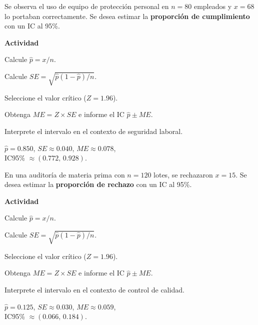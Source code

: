 \begin{ejercicio}[Uso de EPP (n=80)]
Se observa el uso de equipo de protección personal en $n=80$ empleados y $x=68$ lo portaban correctamente.
Se desea estimar la \textbf{proporción de cumplimiento} con un IC al 95\%.


\textbf{Actividad}
\begin{pasos}
  \item Calcule $\hat{p} = x/n$.
  \item Calcule $SE = \sqrt{\hat{p}(1-\hat{p})/n}$.
  \item Seleccione el valor crítico ($Z=1.96$).
  \item Obtenga $ME=Z \times SE$ e informe el IC $\hat{p}\pm ME$.
  \item Interprete el intervalo en el contexto de seguridad laboral.
\end{pasos}

\begin{clave}
$\hat{p}=0.850$, \quad $SE\approx0.040$, \quad $ME\approx0.078$,\\
IC95\% $\approx (0.772,\,0.928)$.
\end{clave}
\end{ejercicio}


\begin{ejercicio}[Rechazo de lotes (n=120)]
En una auditoría de materia prima con $n=120$ lotes, se rechazaron $x=15$.
Se desea estimar la \textbf{proporción de rechazo} con un IC al 95\%.


\textbf{Actividad}
\begin{pasos}
  \item Calcule $\hat{p} = x/n$.
  \item Calcule $SE = \sqrt{\hat{p}(1-\hat{p})/n}$.
  \item Seleccione el valor crítico ($Z=1.96$).
  \item Obtenga $ME=Z \times SE$ e informe el IC $\hat{p}\pm ME$.
  \item Interprete el intervalo en el contexto de control de calidad.
\end{pasos}

\begin{clave}
$\hat{p}=0.125$, \quad $SE\approx0.030$, \quad $ME\approx0.059$,\\
IC95\% $\approx (0.066,\,0.184)$.
\end{clave}
\end{ejercicio}


